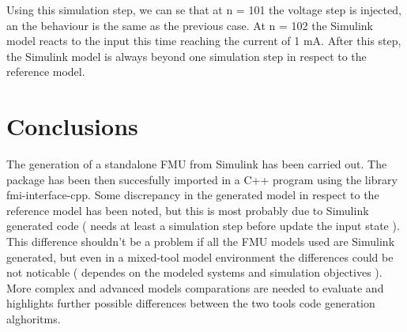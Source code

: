 Using this simulation step, we can se that at n = 101 the voltage step is injected, an the behaviour is the same as the previous case. At n = 102 the Simulink model reacts to the input this time reaching the current of 1 mA.
After this step, the Simulink model is always beyond one simulation step in respect to the reference model.
\section{Conclusions}

The generation of a standalone FMU from Simulink has been carried out. The package has been then succesfully imported in a C++ program using the library fmi-interface-cpp. Some discrepancy in the generated model in respect to the reference model has been noted, but this is most probably due to Simulink generated code ( needs at least a simulation step before update the input state ). 
\newline 
This difference shouldn't be a problem if all the FMU models used are Simulink generated, but even in a mixed-tool model environment the differences could be not noticable ( dependes on the modeled systems and simulation objectives ).
\newline
More complex and advanced models comparations are needed to evaluate and highlights further possible differences between the two tools code generation alghoritms.
